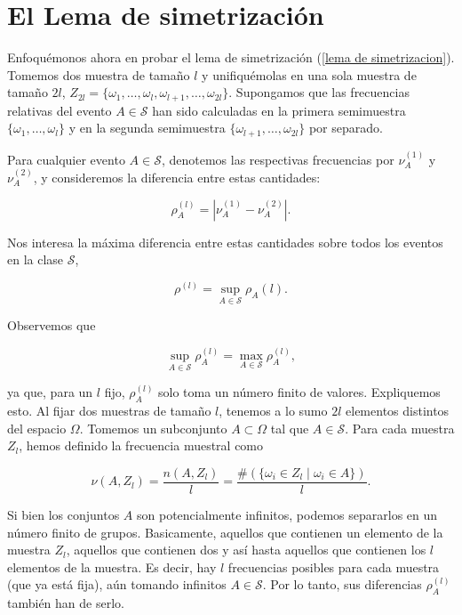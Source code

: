 \documentclass{report}
\begin{document}
\bigskip

\section{El Lema de simetrización}

Enfoquémonos ahora en probar el lema de simetrización (\ref{lema de simetrizacion}). Tomemos dos muestra de tamaño $l$ y
unifiquémolas en una sola muestra de tamaño \( 2l \),
\( Z_{2l} = \{ \omega_1, \dots, \omega_l, \omega_{l+1}, \dots, \omega_{2l} \} \). Supongamos que las frecuencias relativas del evento \( A \in \mathcal{S} \)
han sido calculadas en la primera semimuestra \( \{ \omega_1, \dots, \omega_l \} \) y en la segunda semimuestra \( \{ \omega_{l+1}, \dots, \omega_{2l} \} \)
por separado.

Para cualquier evento $A\in\mathcal{S}$, denotemos las respectivas frecuencias por \( \nu_A^{(1)}\) y \( \nu_A^{(2)} \),
y consideremos la diferencia entre estas cantidades:

\[
\rho^{(l)}_A = |\nu_A^{(1)} - \nu_A^{(2)}|.
\]

Nos interesa la máxima diferencia entre estas cantidades sobre todos los eventos en la clase \( \mathcal{S} \),

\[
\rho^{(l)} = \sup_{A \in \mathcal{S}} \rho_A(l).
\]

Observemos que

\[
\sup_{A \in \mathcal{S}} \rho_A^{(l)} = \max_{A \in \mathcal{S}} \rho_A^{(l)},
\]

ya que, para un \( l \) fijo, \( \rho_A^{(l)} \) solo toma un número finito de valores. Expliquemos esto.
Al fijar dos muestras de tamaño $l$, tenemos a lo sumo $2l$ elementos distintos del espacio $\Omega$. Tomemos un
subconjunto $A\subset \Omega$ tal que $A\in\mathcal{S}$. Para cada muestra $Z_l$, hemos definido la frecuencia muestral
como

\[
\nu(A,Z_l) = \frac{n(A,Z_l)}{l} = \frac{\#(\{ \omega_i \in Z_l \mid \omega_i \in A \})}{l}.
\]

Si bien los conjuntos $A$ son potencialmente infinitos, podemos separarlos en un número finito de grupos. Basicamente,
aquellos que contienen un elemento de la muestra $Z_l$, aquellos que contienen dos y así hasta aquellos que contienen
los $l$ elementos de la muestra. Es decir, hay $l$ frecuencias posibles para cada muestra (que ya está fija), aún
tomando infinitos $A\in\mathcal{S}$. Por lo tanto, sus diferencias $\rho_A^{(l)}$ también han de serlo.
\end{document}
